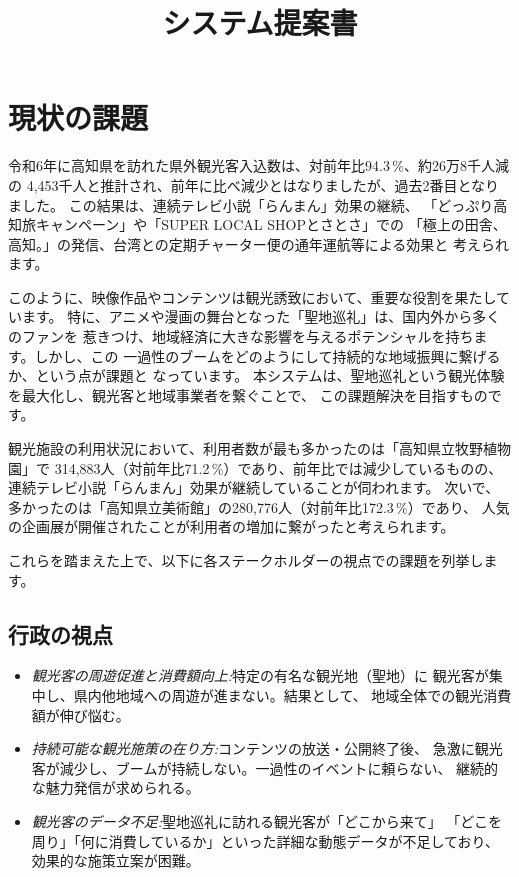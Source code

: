 \documentclass{docs}
\title{システム提案書}
\begin{document}
\section{現状の課題}
令和6年に高知県を訪れた県外観光客入込数は、対前年比94.3\,\%、約26万8千人減の
4,453千人と推計され、前年に比べ減少とはなりましたが、過去2番目となりました。
この結果は、連続テレビ小説「らんまん」効果の継続、
「どっぷり高知旅キャンペーン」や「SUPER LOCAL SHOPとさとさ」での
「極上の田舎、高知。」の発信、台湾との定期チャーター便の通年運航等による効果と
考えられます。

このように、映像作品やコンテンツは観光誘致において、重要な役割を果たしています。
特に、アニメや漫画の舞台となった「聖地巡礼」は、国内外から多くのファンを
惹きつけ、地域経済に大きな影響を与えるポテンシャルを持ちます。しかし、この
一過性のブームをどのようにして持続的な地域振興に繋げるか、という点が課題と
なっています。
本システムは、聖地巡礼という観光体験を最大化し、観光客と地域事業者を繋ぐことで、
この課題解決を目指すものです。

観光施設の利用状況において、利用者数が最も多かったのは「高知県立牧野植物園」で
314,883人（対前年比71.2\,\%）であり、前年比では減少しているものの、
連続テレビ小説「らんまん」効果が継続していることが伺われます。
次いで、多かったのは「高知県立美術館」の280,776人（対前年比172.3\,\%）であり、
人気の企画展が開催されたことが利用者の増加に繋がったと考えられます。

これらを踏まえた上で、以下に各ステークホルダーの視点での課題を列挙します。
\subsection{行政の視点}
\begin{itemize}
	\item \emph{観光客の周遊促進と消費額向上:}特定の有名な観光地（聖地）に
	観光客が集中し、県内他地域への周遊が進まない。結果として、
	地域全体での観光消費額が伸び悩む。
	\item \emph{持続可能な観光施策の在り方:}コンテンツの放送・公開終了後、
	急激に観光客が減少し、ブームが持続しない。一過性のイベントに頼らない、
	継続的な魅力発信が求められる。
	\item \emph{観光客のデータ不足:}聖地巡礼に訪れる観光客が「どこから来て」
	「どこを周り」「何に消費しているか」といった詳細な動態データが不足しており、
	効果的な施策立案が困難。
\end{itemize}
\end{document}
